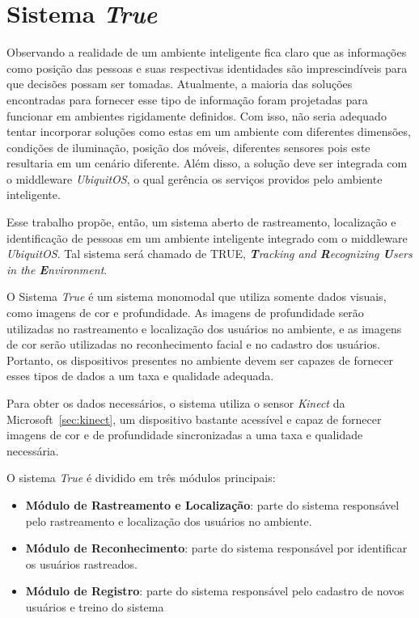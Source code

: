 \chapter{Sistema \textit{True}}

Observando a realidade de um ambiente inteligente fica claro que as informações como posição das pessoas e suas respectivas identidades são imprescindíveis para que decisões possam ser tomadas. Atualmente, a maioria das soluções encontradas para fornecer esse tipo de informação foram projetadas para funcionar em ambientes rigidamente definidos. Com isso, não seria adequado tentar incorporar soluções como estas em um ambiente com diferentes dimensões, condições de iluminação, posição dos móveis, diferentes sensores pois este resultaria em um cenário diferente. Além disso, a solução deve ser integrada com o middleware \textit{UbiquitOS}, o qual gerência os serviços providos pelo ambiente inteligente.

Esse trabalho propõe, então, um sistema aberto de rastreamento, localização e identificação de pessoas em um ambiente inteligente integrado com o middleware \textit{UbiquitOS}. Tal sistema será chamado de TRUE, \textit{\textbf{T}racking and \textbf{R}ecognizing \textbf{U}sers in the \textbf{E}nvironment}.

O Sistema \textit{True} é um sistema monomodal que utiliza somente dados visuais, como imagens de cor e profundidade. As imagens de profundidade serão utilizadas no rastreamento e localização dos usuários no ambiente, e as imagens de cor serão utilizadas no reconhecimento facial e no cadastro dos usuários. Portanto, os dispositivos presentes no ambiente devem ser capazes de fornecer esses tipos de dados a um taxa e qualidade adequada. 

Para obter os dados necessários, o sistema utiliza o sensor \textit{Kinect} da Microsoft~\ref{sec:kinect}, um dispositivo bastante acessível e capaz de fornecer imagens de cor e de profundidade sincronizadas a uma taxa e qualidade necessária.

O sistema \textit{True} é dividido em três módulos principais:

	\begin{itemize}
		\item \textbf{Módulo de Rastreamento e Localização}: parte do sistema responsável pelo rastreamento e localização dos usuários no ambiente.
		\item \textbf{Módulo de Reconhecimento}: parte do sistema responsável por identificar os usuários rastreados.
		\item \textbf{Módulo de Registro}: parte do sistema responsável pelo cadastro de novos usuários e treino do sistema
	\end{itemize}

